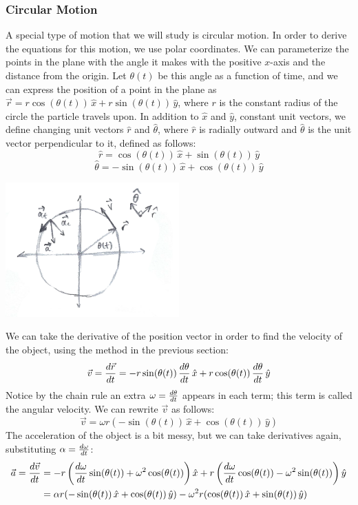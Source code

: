 \subsubsection{Circular Motion}
A special type of motion that we will study is circular motion. In order to derive the equations for this motion, we use polar coordinates. We can parameterize the points in the plane with the angle it makes with the positive $x$-axis and the distance from the origin. Let $\theta(t)$ be this angle as a function of time, and we can express the position of a point in the plane as $\vec r = r \cos (\theta (t)) \, \hat x + r \sin (\theta (t)) \, \hat y$, where $r$ is the constant radius of the circle the particle travels upon. In addition to $\hat x$ and $\hat y$, constant unit vectors, we define changing unit vectors $\hat r$ and $\hat \theta$, where $\hat r$ is radially outward and $\hat \theta$ is the unit vector perpendicular to it, defined as follows: \\
\[
	\hat r = \cos (\theta (t)) \, \hat x + \sin (\theta (t)) \, \hat y 
\]
\[
	\hat \theta = -\sin (\theta (t)) \, \hat x + \cos (\theta (t)) \, \hat y
\]
\begin{center}
	\includegraphics[width=0.5\textwidth]{images/mechintro/circular_motion.png}\\
\end{center}
We can take the derivative of the position vector in order to find the velocity of the object, using the method in the previous section: 
\[
	\vec v = \frac{d \vec r}{d t} = - r \sin (\theta (t)) \, \frac{d \theta}{d t} \, \hat x + r \cos (\theta (t)) \, \frac{d \theta}{d t} \, \hat y
\]
Notice by the chain rule an extra $\omega = \frac{d \theta}{d t}$ appears in each term; this term is called the angular velocity. We can rewrite $\vec v$ as follows: 
\[
	\vec v = \omega r (-\sin (\theta (t)) \, \hat x + \cos (\theta (t)) \, \hat y) 
\]
The acceleration of the object is a bit messy, but we can take derivatives again, substituting $\alpha = \frac{d \omega}{d t}$: 
\begin{align*}
	\vec a = \frac{d \vec v}{d t} &= -r \left(\frac{d \omega}{d t}\sin (\theta (t)) + \omega^2 \cos (\theta (t)) \right) \hat x + r \left(\frac{d \omega}{d t} \cos (\theta (t)) - \omega^2 \sin (\theta (t)) \right) \hat y \\
	&= \alpha r (-\sin (\theta (t)) \, \hat x + \cos (\theta (t)) \, \hat y) - \omega^2 r (\cos (\theta (t)) \, \hat x + \sin (\theta (t)) \, \hat y) 
\end{align*}
